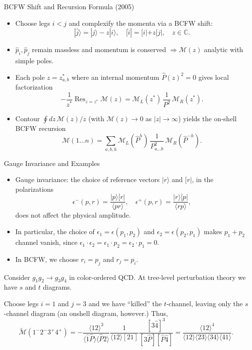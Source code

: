 \documentclass{if-beamer}
\begin{document}
\begin{frame}{BCFW Shift and Recursion Formula (2005)}
\cite{Britto:2005fq}
\begin{itemize}
  \item Choose legs $i<j$ and complexify the momenta via a BCFW shift: 
  \[
     |\hat{j}\rangle=|j\rangle-z|i\rangle,\quad[\hat{i}|=[i|+z[j|,\quad z\in\mathbb{C}.
  \]
  \item $\hat p_i,\hat p_j$ remain massless and momentum is conserved $\Rightarrow\mathcal{M}(z)$ analytic with simple poles.
  \item Each pole $z=z_{a,b}^*$ where an internal momentum \mbox{$\hat P(z)^2\!=\!0$} gives local factorization
  \[
     -\frac1{z^*}\operatorname{Res}_{z=z^*}\mathcal{M}(z)=\mathcal{M}_L(z^*)\,\frac{1}{P^2}\,\mathcal{M}_R(z^*).
  \]
  \item Contour $\oint\!dz\,\mathcal{M}(z)/z$ (with $\mathcal{M}(z)\to0$ as $|z|\to\infty$) yields the on‑shell BCFW recursion\;
  \[
  \mathcal{M}(1\dots n)=\sum_{a,b,h}\mathcal{M}_L(\hat P^h)\,\frac{1}{P_{a\dots b}^2}\,\mathcal{M}_R(\hat P^{-h}).
  \]
\end{itemize}
\end{frame}



\begin{frame}{Gauge Invariance and Examples}
\begin{itemize}
  \item Gauge invariance: the choice of reference vectors $|r\rangle$ and $[r|$, in the polarizations
  \[
    \epsilon^-(p,r)=\frac{|p\rangle[r|}{\langle pr\rangle},\quad
    \epsilon^+(p,r)=\frac{|r\rangle[p|}{\langle rp\rangle},
  \]
  does not affect the physical amplitude.
  \item In particular, the choice of $\epsilon_1 = \epsilon(p_1, p_2)$ and $\epsilon_2 = \epsilon(p_2, p_1)$ makes $p_1 + p_2$ channel vanish, since $\epsilon_1 \cdot \epsilon_2 = \epsilon_1 \cdot p_2 = \epsilon_2 \cdot p_1 = 0$.
  \item In BCFW, we choose $r_i = p_j$ and $r_j = p_i$.
\end{itemize}
\begin{example}
  Consider $g_1g_2 \to g_3g_4$ in color-ordered QCD. At tree-level perturbation theory we have $s$ and $t$ diagrams.

  Choose legs $i=1$ and $j=3$ and we have  ``killed'' the $t$-channel, leaving only the $s$-channel diagram (an onshell diagram, however.) Thus,
  \[
\widetilde{\mathcal{M}}\left(1^{-} 2^{-} 3^{+} 4^{+}\right)=-\frac{\langle\hat{1} 2\rangle^3}{\langle\hat{1} \hat{P}\rangle\langle\hat{P} 2\rangle} \frac{1}{\langle 12\rangle[21]} \frac{[3 \hat{4}]^3}{[3 \hat{P}][\hat{P} \hat{4}]} = 
\frac{\langle 12\rangle^4}{\langle 12\rangle\langle 23\rangle\langle 34\rangle\langle 41\rangle}.
\]
\end{example}

\end{frame}
\end{document}
